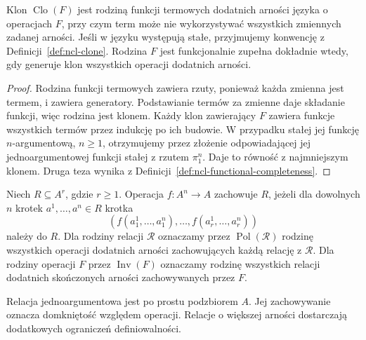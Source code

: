 \begin{stwierdzenie}\label{prop:ncl-clone-terms}
Klon $\operatorname{Clo}(F)$ jest rodziną funkcji
termowych dodatnich arności języka o operacjach $F$,
przy czym term może nie wykorzystywać wszystkich
zmiennych zadanej arności. Jeśli w języku występują
stałe, przyjmujemy konwencję z Definicji~\ref{def:ncl-clone}.
Rodzina $F$ jest funkcjonalnie zupełna dokładnie wtedy,
gdy generuje klon wszystkich operacji dodatnich arności.
\end{stwierdzenie}
\begin{proof}
Rodzina funkcji termowych zawiera rzuty, ponieważ
każda zmienna jest termem, i zawiera generatory.
Podstawianie termów za zmienne daje składanie funkcji,
więc rodzina jest klonem. Każdy klon zawierający $F$
zawiera funkcje wszystkich termów przez indukcję
po ich budowie. W przypadku stałej jej funkcję
$n$-argumentową, $n\geq1$, otrzymujemy przez
złożenie odpowiadającej jej jednoargumentowej
funkcji stałej z rzutem $\pi_1^n$. Daje to równość z najmniejszym klonem.
Druga teza wynika z
Definicji~\ref{def:ncl-functional-completeness}.
\end{proof}

\begin{definicja}\label{def:ncl-pol-inv}
Niech $R\subseteq A^r$, gdzie $r\geq1$.
Operacja $f:A^n\to A$ zachowuje $R$, jeżeli dla
dowolnych $n$ krotek $a^1,\ldots,a^n\in R$
krotka
\[
 (f(a^1_1,\ldots,a^n_1),\ldots,
   f(a^1_r,\ldots,a^n_r))
\]
należy do $R$. Dla rodziny relacji $\mathcal R$
oznaczamy przez $\operatorname{Pol}(\mathcal R)$
rodzinę wszystkich operacji dodatnich arności
zachowujących każdą relację z $\mathcal R$.
Dla rodziny operacji $F$ przez $\operatorname{Inv}(F)$
oznaczamy rodzinę wszystkich relacji dodatnich
skończonych arności zachowywanych przez $F$.
\end{definicja}
Relacja jednoargumentowa jest po prostu podzbiorem
$A$. Jej zachowywanie oznacza domkniętość względem
operacji. Relacje o większej arności dostarczają
dodatkowych ograniczeń definiowalności.

